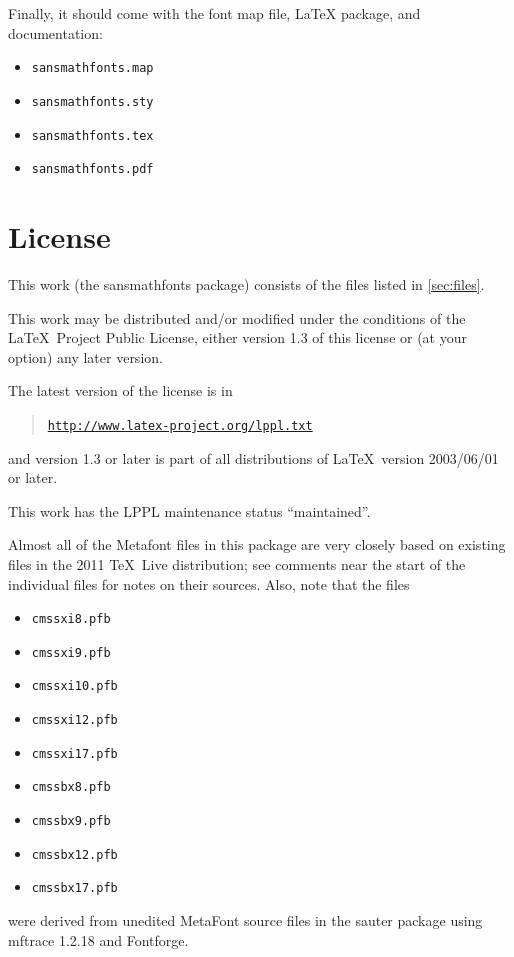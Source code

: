 \documentclass{amsart}
\begin{document}
Finally, it should come with the font map file, LaTeX package, and documentation:

\begin{itemize}
\item \texttt{sansmathfonts.map}
\item \texttt{sansmathfonts.sty}
\item \texttt{sansmathfonts.tex}
\item \texttt{sansmathfonts.pdf}
\end{itemize}





\section{License}

This work (the \textsf{sansmathfonts} package) consists of the
files listed in \autoref{sec:files}.

This work may be distributed and/or modified under the
conditions of the \LaTeX\ Project Public License, either
version 1.3 of this license or (at your option) any
later version.

The latest version of the license is in
\begin{quote}
\href {http://www.latex-project.org/lppl.txt} 
{\texttt{http://www.latex-project.org/lppl.txt}}
\end{quote}
and version 1.3 or later is part of all distributions of
\LaTeX\ version 2003/06/01 or later.

This work has the LPPL maintenance status ``maintained''.

Almost all of the Metafont files in this package are very closely based on existing files in the 2011 \TeX\ Live distribution; see comments near the start of the individual files for notes on their sources. Also, note that the 
files
\begin{itemize}
\item \texttt{cmssxi8.pfb}
\item \texttt{cmssxi9.pfb}
\item \texttt{cmssxi10.pfb}
\item \texttt{cmssxi12.pfb}
\item \texttt{cmssxi17.pfb}
\item \texttt{cmssbx8.pfb}
\item \texttt{cmssbx9.pfb}
\item \texttt{cmssbx12.pfb}
\item \texttt{cmssbx17.pfb}
\end{itemize}
were derived from unedited MetaFont source files in the \textsf{sauter} package using mftrace 1.2.18 and Fontforge. 
\end{document}
